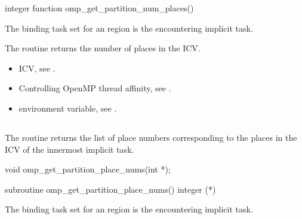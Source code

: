 \fortranspecificstart
\begin{boxedcode}
integer function omp\_get\_partition\_num\_places()
\end{boxedcode}
\fortranspecificend

\binding
The binding task set for an   region is the encountering implicit task.

\effect
The  routine returns the number of places in the  ICV.

\crossreferences
\begin{itemize}
\item {} ICV, see 
.

\item Controlling OpenMP thread affinity, see 
. 

\item {} environment variable, see 
.
\end{itemize}





\subsection{}
\label{subsec:omp_get_partition_place_nums}

\summary
The  routine returns the list of place numbers corresponding to the places in the  ICV of the innermost implicit task.

\format
\ccppspecificstart
\begin{boxedcode}
void omp\_get\_partition\_place\_nums(int *);
\end{boxedcode}
\ccppspecificend

\fortranspecificstart
\begin{boxedcode}
subroutine omp\_get\_partition\_place\_nums()
integer (*)
\end{boxedcode}
\fortranspecificend

\binding
The binding task set for an  region is the encountering implicit task.

